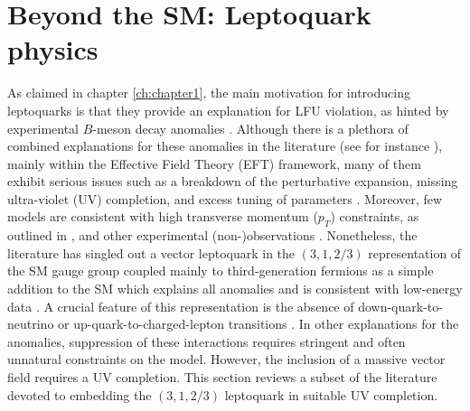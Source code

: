 \section{Beyond the SM: Leptoquark physics}

As claimed in chapter \ref{ch:chapter1}, the main motivation for introducing leptoquarks is that they provide an explanation for LFU violation, as hinted by experimental $B$-meson decay anomalies \cite{lhcb_measurement,lhcbcollaboration2021test}. Although there is a plethora of combined explanations for these anomalies in the literature (see for instance \cite{buttazzo_b-physics_2017, calibbi_effective_2015, bhattacharya_simultaneous_2015, alonso_lepton_2015}), mainly within the Effective Field Theory (EFT) framework, many of them exhibit serious issues such as a breakdown of the perturbative expansion, missing ultra-violet (UV) completion, and excess tuning of parameters \cite{di_luzio_maximal_2018}. Moreover, few models are consistent with high transverse momentum ($p_T$) constraints, as outlined in \cite{faroughy_confronting_2017, greljo_high-p_tdilepton_2017}, and other experimental (non-)observations \cite{di_luzio_gauge_2017}. Nonetheless, the literature has singled out a vector leptoquark in the $(3,1,2/3)$ representation of the SM gauge group coupled mainly to third-generation fermions as a simple addition to the SM which explains all anomalies and is consistent with low-energy data \cite{buttazzo_b-physics_2017}. A crucial feature of this representation is the absence of down-quark-to-neutrino or up-quark-to-charged-lepton transitions \cite{di_luzio_gauge_2017}. In other explanations for the anomalies, suppression of these interactions requires stringent and often unnatural constraints on the model. However, the inclusion of a massive vector field requires a UV completion. This section reviews a subset of the literature devoted to embedding the $(3,1,2/3)$ leptoquark in suitable UV completion.

